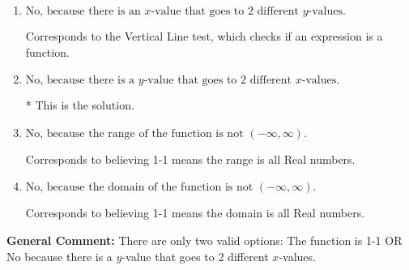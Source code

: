 \documentclass{extbook}[14pt]
\begin{document}
\begin{enumerate}
{\begin{enumerate}[label=\Alph*.]
Corresponds to believing the function passes the Horizontal Line test.
\item \( \text{No, because there is an $x$-value that goes to 2 different $y$-values.} \)

Corresponds to the Vertical Line test, which checks if an expression is a function.
\item \( \text{No, because there is a $y$-value that goes to 2 different $x$-values.} \)

* This is the solution.
\item \( \text{No, because the range of the function is not $(-\infty, \infty)$.} \)

Corresponds to believing 1-1 means the range is all Real numbers.
\item \( \text{No, because the domain of the function is not $(-\infty, \infty)$.} \)

Corresponds to believing 1-1 means the domain is all Real numbers.
\end{enumerate}

\textbf{General Comment:} There are only two valid options: The function is 1-1 OR No because there is a $y$-value that goes to 2 different $x$-values.
}
\end{enumerate}
\end{document}
